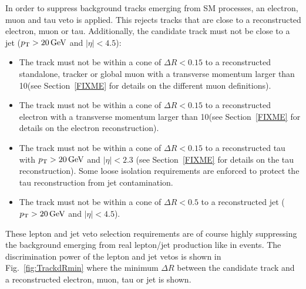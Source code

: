 In order to suppress background tracks emerging from SM processes, an electron, muon and tau veto is applied.
This rejects tracks that are close to a reconstructed electron, muon or tau.
Additionally, the candidate track must not be close to a jet ($p_{\text{T}}>20\,\text{Ge}\kern-0.06667em\text{V}$ and $|\eta|<4.5$):
\begin{itemize}
\renewcommand{\labelitemi}{\footnotesize{\ding{118}}}
\item The track must not be within a cone of $\Delta R<0.15$ to a reconstructed standalone, tracker or global muon with a transverse momentum larger than 10\gev (see Section~\ref{FIXME} for details on the different muon definitions).
\item The track must not be within a cone of $\Delta R<0.15$ to a reconstructed electron with a transverse momentum larger than 10\gev (see Section~\ref{FIXME} for details on the electron reconstruction).
\item The track must not be within a cone of $\Delta R<0.15$ to a reconstructed tau with $p_{\text{T}}>20\,\text{Ge}\kern-0.06667em\text{V}$ and $|\eta|<2.3$ (see Section~\ref{FIXME} for details on the tau reconstruction). 
      Some loose isolation requirements are enforced to protect the tau reconstruction from jet contamination.
\item The track must not be within a cone of $\Delta R< 0.5$ to a reconstructed jet ($p_{\text{T}}>20\,\text{Ge}\kern-0.06667em\text{V}$ and $|\eta|<4.5$).\\
\end{itemize}
These lepton and jet veto selection requirements are of course highly suppressing the background emerging from real lepton/jet production like in \WJets events.
The discrimination power of the lepton and jet vetos is shown in Fig.~\ref{fig:TrackdRmin} where the minimum $\Delta R$ between the candidate track and a reconstructed electron, muon, tau or jet is shown.\\
